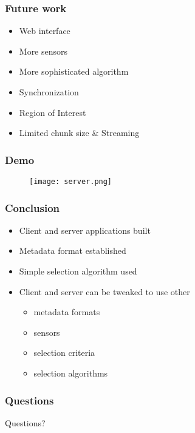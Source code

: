 \begin{frame}
	\frametitle{Future work}
	\begin{itemize}
		\item Web interface
		\item More sensors
		\item More sophisticated algorithm
		\item Synchronization
		\item Region of Interest
		\item Limited chunk size \& Streaming
	\end{itemize}
\end{frame}

\begin{frame}
	\frametitle{Demo}
		\begin{figure}[!t]
			\centering
			\texttt{[image: server.png]}
			\label{fig:server}
		\end{figure}
\end{frame}

\begin{frame}
	\frametitle{Conclusion}
	\begin{itemize}
		\item Client and server applications built
		\item Metadata format established
		\item Simple selection algorithm used
		\item Client and server can be tweaked to use other
		\begin{itemize}
			\item metadata formats
			\item sensors
			\item selection criteria
			\item selection algorithms
		\end{itemize}
	\end{itemize}
\end{frame}

\begin{frame}
	\frametitle{Questions}
	\centering
	\Huge Questions?
\end{frame}